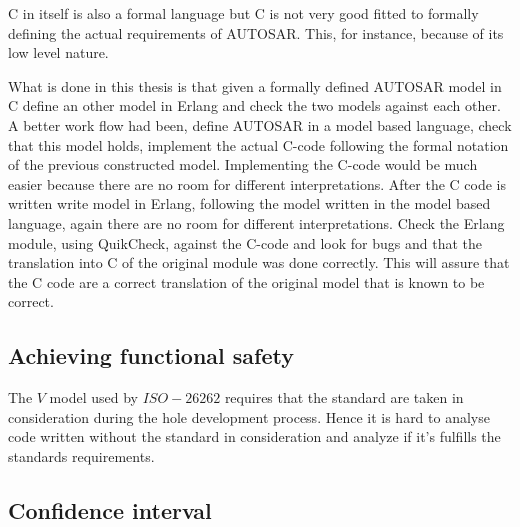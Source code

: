 C in itself is also a formal language but C is not very good fitted to formally defining
the actual requirements of AUTOSAR. This, for instance, because of its low level nature.

What is done in this thesis is that given a formally defined AUTOSAR model in C
define an other model in Erlang and check the two models against each other.
A better work flow had been, define AUTOSAR in a model based language, check
that this model holds, implement the actual C-code following the formal notation of
the previous constructed model. Implementing the C-code would be much easier
because there are no room for different interpretations. After the C code is written write model
in Erlang, following the model written in the model based language, again there
are no room for different interpretations. Check the Erlang module, using
QuikCheck, against the C-code and look for bugs and that the translation into C of the
original module was done correctly. This will assure that the C code are a
correct translation of the original model that is known to be correct.



\subsection{Achieving functional safety}
The $V$ model used by $ISO-26262$ requires that the standard are taken in
consideration during the hole development process. Hence it is hard to analyse
code written without the standard in consideration and analyze if it's fulfills
the standards requirements.

\subsection{Confidence interval}


